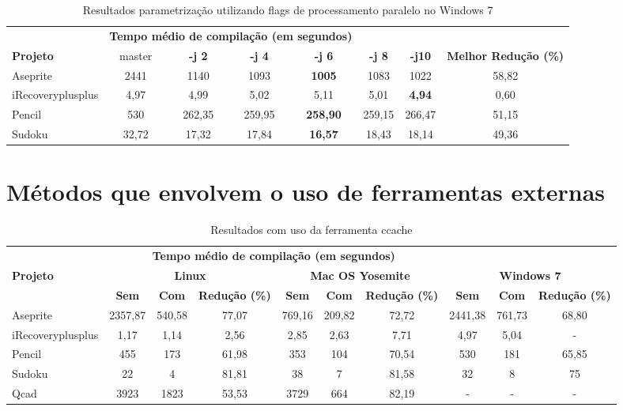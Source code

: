 \begin{table}[!ht]
\tiny
\centering
\caption{Resultados parametrização utilizando flags de processamento paralelo no Windows 7}
\label{tab:flags_processamento_paralelo:windows}
\begin{tabular}{lccccccc}
& \multicolumn{4}{c}{\textbf{Tempo médio de compilação (em segundos)} } \\
\textbf{Projeto} & master & \textbf{-j 2} & \textbf{-j 4} & \textbf{-j 6} & \textbf{-j 8} & \textbf{-j10} &  \textbf{Melhor Redução (\%)} \\ \toprule
Aseprite & 2441 & 1140 & 1093 & \textbf{1005} & 1083 & 1022  &  58,82  \\ 
iRecoveryplusplus & 4,97  & 4,99 &  5,02 & 5,11 & 5,01 & \textbf{4,94} & 0,60 \\ 
Pencil & 530 & 262,35 & 259,95 & \textbf{258,90} & 259,15 & 266,47  & 51,15 \\ 
Sudoku & 32,72   & 17,32 & 17,84 & \textbf{16,57} & 18,43 & 18,14 & 49,36 \\ 
\end{tabular}
\end{table}


\section{Métodos que envolvem o uso de ferramentas externas}


\begin{table}[!ht]
\tiny
\centering
\caption{Resultados com uso da ferramenta ccache}
\label{tab:ccache}
\begin{tabular}{lccccccccc}
& \multicolumn{6}{c}{\textbf{Tempo médio de compilação (em segundos)} } \\
\textbf{Projeto} & \multicolumn{3}{c}{\textbf{Linux}} & \multicolumn{3}{c}{\textbf{Mac OS Yosemite}} & \multicolumn{3}{c}{\textbf{Windows 7}} \\ 
& \textbf{Sem } & \textbf{Com }  & \textbf{Redução (\%)} & \textbf{Sem } & \textbf{Com }  & \textbf{Redução (\%)} & \textbf{Sem } & \textbf{Com }  & \textbf{Redução (\%)} \\
\toprule
Aseprite & 2357,87 & 540,58 & 77,07 & 769,16 & 209,82 & 72,72  & 2441,38 & 761,73  & 68,80 \\ 
iRecoveryplusplus & 1,17 & 1,14 & 2,56    & 2,85 & 2,63 & 7,71  & 4,97 & 5,04 & -  \\ 
Pencil & 455  & 173 & 61,98 & 353 & 104  & 70,54  & 530  & 181  & 65,85 \\ 
Sudoku & 22 & 4 & 81,81  & 38 & 7 & 81,58  & 32 & 8  &  75    \\ 
Qcad  & 3923 & 1823 & 53,53 & 3729 & 664 & 82,19 &  -  & -  & -  \\ 
\end{tabular}
\end{table}

